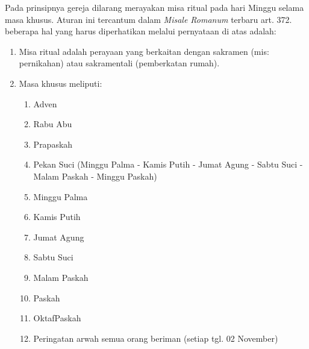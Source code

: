     Pada prinsipnya gereja dilarang merayakan misa ritual pada hari Minggu selama masa khusus. Aturan ini tercantum dalam \textit{Misale Romanum} terbaru art. 372. beberapa hal yang harus diperhatikan melalui pernyataan di atas adalah:

\begin{enumerate}
\item    Misa ritual adalah perayaan yang berkaitan dengan sakramen (mis: pernikahan) atau sakramentali (pemberkatan rumah).
\item  Masa khusus meliputi:
\begin{enumerate}
\item    Adven
\item    Rabu Abu
\item    Prapaskah
\item    Pekan Suci (Minggu Palma - Kamis Putih - Jumat Agung -  Sabtu Suci -Malam Paskah - Minggu Paskah)
\item     Minggu Palma
\item Kamis Putih

\item Jumat Agung
\item Sabtu Suci
\item Malam Paskah
\item Paskah
\item OktafPaskah
\item Peringatan arwah semua orang beriman (setiap tgl. 02 November)          
\end{enumerate}
\end{enumerate}


